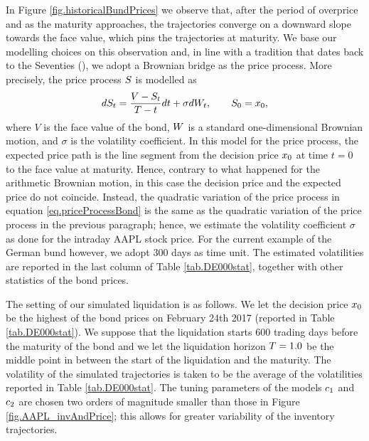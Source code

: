 \documentclass[10pt,a4paper]{article}
\begin{document}
	In Figure \ref{fig.historicalBundPrices} we observe that, after the period of overprice and as the maturity approaches, the trajectories converge on a downward slope towards the face value, which pins the trajectories at maturity. We base our modelling choices on this observation and, in line with a tradition that dates back to the Seventies (\cite{Boy70sto}), we adopt a Brownian bridge as the price process. More precisely, the price process $S$ is modelled as 
	\begin{equation}\label{eq.priceProcessBond}
	dS_t = \frac{V - S_t}{T - t} dt + \sigma dW_t, \qquad S_0=x_0,
	\end{equation}  
	where $V$ is the face value of the bond, $W$ is a standard one-dimensional Brownian motion, and $\sigma$ is the volatility coefficient. In this model for the price process, the expected price path is the line segment from the decision price $x_0$ at time $t=0$ to the face value at maturity. Hence, contrary to what happened for the arithmetic Brownian motion,  in this case the decision price and the expected price do not coincide. Instead, the quadratic variation of the price process in equation \eqref{eq.priceProcessBond} is the same as the quadratic variation of the price process in the previous  paragraph; hence, we estimate the volatility coefficient $\sigma$ as done for the intraday AAPL stock price. For the current example of the German bund however, we adopt 300 days as time unit. The estimated volatilities are reported in the last column of Table \ref{tab.DE000stat}, together with other statistics of the bond prices. 
	
	The setting of our simulated liquidation is as follows. We let the decision price $x_0$ be the highest  of the bond prices on February 24th 2017 (reported in Table \ref{tab.DE000stat}). We suppose that the liquidation starts 600 trading days before the maturity of the bond and we let the liquidation horizon $T = 1.0$ be the middle point in between the start of the liquidation and the maturity. The volatility of the simulated trajectories is taken to be the average of the volatilities reported in Table \ref{tab.DE000stat}. The tuning parameters of the models $c_{1}$ and $c_{2}$ are chosen two orders of magnitude smaller than those in Figure \ref{fig.AAPL_invAndPrice}; this allows for greater variability of the inventory trajectories.
	
\end{document}
